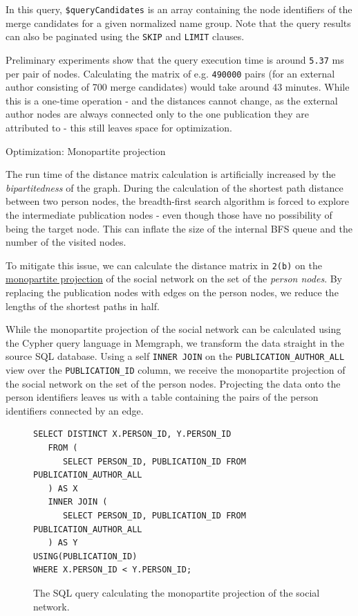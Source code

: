 In this query, \texttt{\$queryCandidates} is an array containing the node identifiers of the merge candidates for a given normalized name group.
Note that the query results can also be paginated using the \texttt{SKIP} and \texttt{LIMIT} clauses.

Preliminary experiments show that the query execution time is around \texttt{5.37} ms per pair of nodes.
Calculating the matrix of e.g. \texttt{490000} pairs (for an external author consisting of 700 merge candidates) would take around 43 minutes.
While this is a one-time operation - and the distances cannot change, as the external author nodes are always connected only to the one publication they are attributed to - this still leaves space for optimization.

\begin{mybox}
    {Optimization: Monopartite projection}

    The run time of the distance matrix calculation is artificially increased by the \textit{bipartitedness} of the graph.
    During the calculation of the shortest path distance between two person nodes, 
    the breadth-first search algorithm is forced to explore the intermediate publication nodes - even though those have no possibility of being the target node.
    This can inflate the size of the internal BFS queue and the number of the visited nodes.
    
    To mitigate this issue, we can calculate the distance matrix in \texttt{2(b)} on the \hyperref[def:monopartite-projection]{monopartite projection} of the social network on 
    the set of the \textit{person nodes}. By replacing the publication nodes with edges on the person nodes, we reduce the lengths of the shortest paths in half.
\end{mybox}

While the monopartite projection of the social network can be calculated using the Cypher query language in Memgraph,
we transform the data straight in the source SQL database. Using a self \texttt{INNER JOIN} on the \texttt{PUBLICATION\_AUTHOR\_ALL} view over the \texttt{PUBLICATION\_ID} column,
we receive the monopartite projection of the social network on the set of the person nodes. Projecting the data onto the person identifiers
leaves us with a table containing the pairs of the person identifiers connected by an edge.

\begin{figure}[!ht]
\begin{verbatim}
SELECT DISTINCT X.PERSON_ID, Y.PERSON_ID 
   FROM (
      SELECT PERSON_ID, PUBLICATION_ID FROM PUBLICATION_AUTHOR_ALL
   ) AS X 
   INNER JOIN (
      SELECT PERSON_ID, PUBLICATION_ID FROM PUBLICATION_AUTHOR_ALL
   ) AS Y 
USING(PUBLICATION_ID)
WHERE X.PERSON_ID < Y.PERSON_ID;
\end{verbatim}
\captionsetup{width=.9\linewidth}
\caption{The SQL query calculating the monopartite projection of the social network.}
\label{fig:monopartite-projection}
\end{figure}

